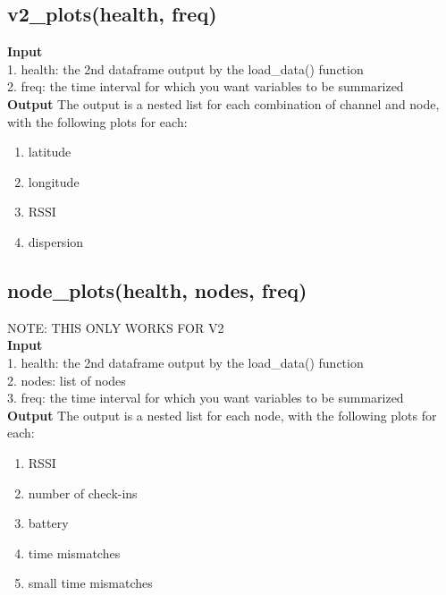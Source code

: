 \documentclass[
]{book}
\providecommand{\tightlist}{%
  \setlength{\itemsep}{0pt}\setlength{\parskip}{0pt}}
\begin{document}
\hypertarget{v2_plotshealth-freq}{%
\subsection{v2\_plots(health, freq)}\label{v2_plotshealth-freq}}

\textbf{Input}\\
1. health: the 2nd dataframe output by the load\_data() function\\
2. freq: the time interval for which you want variables to be summarized\\
\textbf{Output} The output is a nested list for each combination of channel and node, with the following plots for each:

\begin{enumerate}
\def\labelenumi{\arabic{enumi}.}
\tightlist
\item
  latitude\\
\item
  longitude\\
\item
  RSSI\\
\item
  dispersion
\end{enumerate}

\hypertarget{node_plotshealth-nodes-freq}{%
\subsection{node\_plots(health, nodes, freq)}\label{node_plotshealth-nodes-freq}}

NOTE: THIS ONLY WORKS FOR V2\\
\textbf{Input}\\
1. health: the 2nd dataframe output by the load\_data() function\\
2. nodes: list of nodes\\
3. freq: the time interval for which you want variables to be summarized\\
\textbf{Output} The output is a nested list for each node, with the following plots for each:

\begin{enumerate}
\def\labelenumi{\arabic{enumi}.}
\tightlist
\item
  RSSI\\
\item
  number of check-ins\\
\item
  battery\\
\item
  time mismatches\\
\item
  small time mismatches
\end{enumerate}
\end{document}
